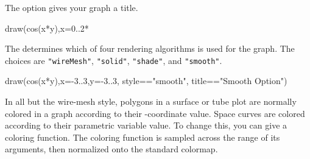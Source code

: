 \begin{psXtc}
\begin{xtccomment}
The option  gives your graph a title.
\end{xtccomment}
\begin{spadsrc}
draw(cos(x*y),x=0..2*%
\end{spadsrc}
\end{psXtc}
%
\begin{psXtc}
\begin{xtccomment}
The  determines which of four rendering algorithms is used for
the graph.
The choices are
{\tt "wireMesh"}, {\tt "solid"}, {\tt "shade"}, and {\tt "smooth"}.
\end{xtccomment}
\begin{spadsrc}
draw(cos(x*y),x=-3..3,y=-3..3, style=="smooth", title=="Smooth Option")
\end{spadsrc}
\end{psXtc}
%

In all but the wire-mesh style, polygons in a surface or tube plot
are normally colored in a graph according to their
-coordinate value.  Space curves are colored according to their
parametric variable value.
To change this, you can give a coloring function.
The coloring function is sampled across the range of its arguments, then
normalized onto the standard \Language{} colormap.

